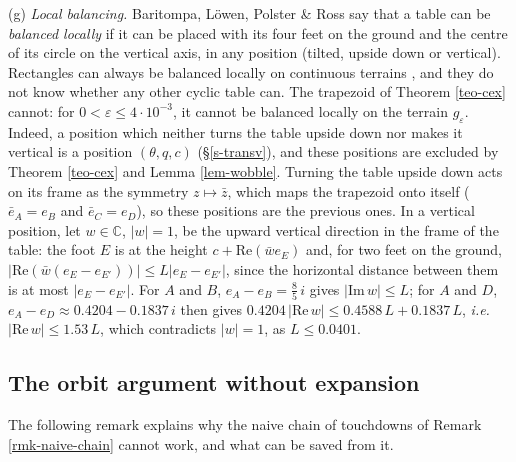 \documentclass[a4paper,11pt,twoside,leqno]{article}
\newcommand{\ie}[0]{\emph{i.e.} }
\newcommand{\eps}[0]{\varepsilon}
\numberwithin{equation}{section}
\begin{document}
\begin{rmk}
(g) \emph{Local balancing.} Baritompa, L\"owen, Polster \& Ross \cite[\S{}2 and \S{}4]{BLPR} say that a table can be \emph{balanced locally} if it can be placed with its four feet on the ground and the centre of its circle on the vertical axis, in any position (tilted, upside down or vertical). Rectangles can always be balanced locally on continuous terrains \cite[Theorem 1]{BLPR}, and they do not know whether any other cyclic table can. The trapezoid of Theorem \ref{teo-cex} cannot: for $0 < \eps \leq 4 \cdot 10^{-3}$, it cannot be balanced locally on the terrain $g_\eps$. Indeed, a position which neither turns the table upside down nor makes it vertical is a position $(\theta, q, c)$ (\S{}\ref{s-transv}), and these positions are excluded by Theorem \ref{teo-cex} and Lemma \ref{lem-wobble}. Turning the table upside down acts on its frame as the symmetry $z \mapsto \bar z$, which maps the trapezoid onto itself ($\bar e_A = e_B$ and $\bar e_C = e_D$), so these positions are the previous ones. In a vertical position, let $w \in \mathbb{C}$, $|w| = 1$, be the upward vertical direction in the frame of the table: the foot $E$ is at the height $c + \mathrm{Re}(\bar w e_E)$ and, for two feet on the ground, $|\mathrm{Re}(\bar w (e_E - e_{E'}))| \leq L |e_E - e_{E'}|$, since the horizontal distance between them is at most $|e_E - e_{E'}|$. For $A$ and $B$, $e_A - e_B = \frac{8}{5}\, i$ gives $|\mathrm{Im}\, w| \leq L$; for $A$ and $D$, $e_A - e_D \approx 0.4204 - 0.1837\, i$ then gives $0.4204\, |\mathrm{Re}\, w| \leq 0.4588\, L + 0.1837\, L$, \ie $|\mathrm{Re}\, w| \leq 1.53\, L$, which contradicts $|w| = 1$, as $L \leq 0.0401$.
\end{rmk}

\subsection{The orbit argument without expansion}\label{ss-orbit}

The following remark explains why the naive chain of touchdowns of Remark \ref{rmk-naive-chain} cannot work, and what can be saved from it.
\end{document}
